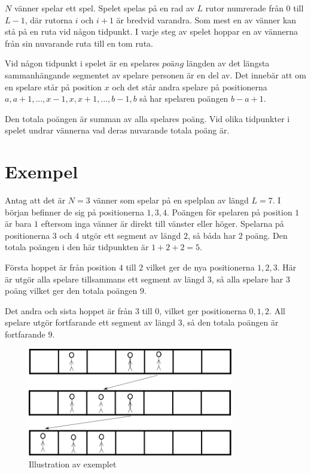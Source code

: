 \newcommand\version{v1}
$N$ vänner spelar ett spel. Spelet spelas på en rad av $L$ rutor numrerade från $0$ till $L - 1$, där rutorna $i$ och $i+1$ är bredvid varandra. Som mest en av vänner kan stå på en ruta vid någon tidpunkt. I varje steg av spelet hoppar en av vännerna från sin nuvarande ruta till en tom ruta.

Vid någon tidpunkt i spelet är en spelares $poäng$ längden av det längsta sammanhängande segmentet av spelare personen är en del av. Det innebär att om en spelare står på position $x$ och det står andra spelare på positionerna $a, a+1, ..., x-1, x, x+1, ..., b-1, b$ så har spelaren poängen $b - a + 1$.

Den totala poängen är summan av alla spelares poäng. Vid olika tidpunkter i spelet undrar vännerna vad deras nuvarande totala poäng är.


\section*{Exempel}
Antag att det är $N = 3$ vänner som spelar på en spelplan av längd $L = 7$. I början befinner de sig på positionerna
$1, 3, 4$. Poängen för spelaren på position $1$ är bara $1$ eftersom inga vänner är direkt till vänster eller höger.
Spelarna på positionerna $3$ och $4$ utgör ett segment av längd $2$, så båda har $2$ poäng. Den totala poängen i den här tidpunkten är $1 + 2 + 2 = 5$.

Första hoppet är från position $4$ till $2$ vilket ger de nya positionerna $1, 2, 3$. Här är utgör alla spelare tillsammans
ett segment av längd $3$, så alla spelare har $3$ poäng vilket ger den totala poängen $9$.

Det andra och sista hoppet är från $3$ till $0$, vilket ger positionerna $0, 1, 2$. All spelare utgör
fortfarande ett segment av längd $3$, så den totala poängen är fortfarande $9$.

\begin{figure}[h!]
  \centering
  \includegraphics[width=0.8\textwidth]{sample.png}
  \caption{Illustration av exemplet}
\end{figure}

